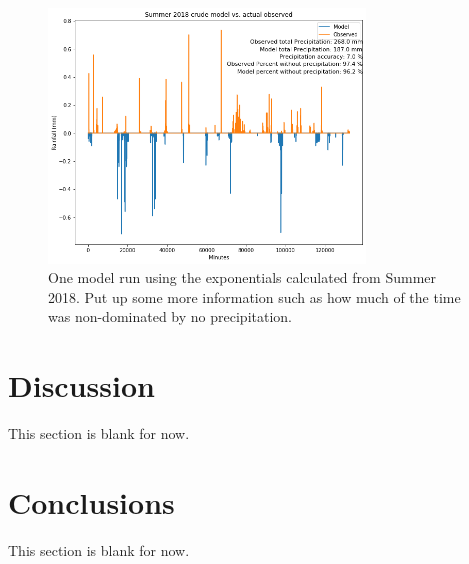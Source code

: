 \documentclass[11pt]{report}
\begin{document}
\clearpage
\begin{figure}[t]
	\centering
	\includegraphics[width=0.75\textwidth]{Figures/run_with_more_info.png}
	\caption[More  run using Summer 2018 climatology]
	{\label{crudesmodel} One model run using the exponentials calculated from Summer 2018. Put up some more information such as how much of the time was non-dominated by no precipitation. }
\end{figure}
\section{Discussion\label{sec:discussion}}
This section is blank for now. 

\section{Conclusions\label{sec:conclusions}}
This section is blank for now. 

\small
\renewcommand{\bibsep}{0em}

\renewcommand{\bibname}{References}


\end{document}
